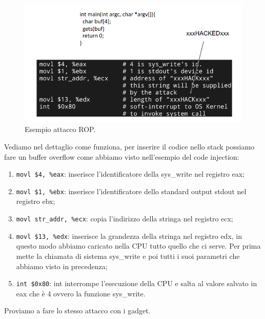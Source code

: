 \begin{figure}[H]
	\centering
    \includegraphics[width=13cm, keepaspectratio]{santini/img/cap_3/es_attacco_rop.png}
	\caption{Esempio attacco ROP.}\label{fig:es_attacco_rop}
\end{figure}
Vediamo nel dettaglio come funziona, per inserire il codice nello stack possiamo fare un buffer overflow come abbiamo visto nell'esempio del code injection:
\begin{enumerate}
    \item \verb|movl $4, %eax|: inserisce l'identificatore della sys\_write nel registro eax;
    \item \verb|movl $1, %ebx|: inserisce l'identificatore dello standard output stdout nel registro ebx;
    \item \verb|movl str_addr, %ecx|: copia l'indirizzo della stringa nel registro ecx;
    \item \verb|movl $13, %edx|: inserisce la grandezza della stringa nel registro edx, in questo modo abbiamo caricato nella CPU tutto quello che ci serve. Per prima mette la chiamata di sistema sys\_write e poi tutti i suoi parametri che abbiamo visto in precedenza;
    \item \verb|int $0x80|: int interrompe l'esecuzione della CPU e salta al valore salvato in eax che è 4 ovvero la funzione sys\_write.
\end{enumerate}
Proviamo a fare lo stesso attacco con i gadget.
